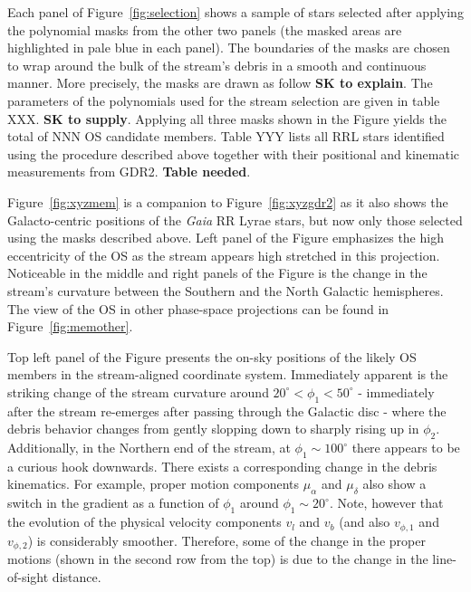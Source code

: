 \documentclass[a4paper,useAMS,usenatbib]{mnras}
\newcommand{\gaia}{\textit{Gaia} }
\begin{document}
Each panel of Figure~\ref{fig:selection} shows a sample of stars
selected after applying the polynomial masks from the other two panels
(the masked areas are highlighted in pale blue in each panel). The
boundaries of the masks are chosen to wrap around the bulk of the
stream's debris in a smooth and continuous manner. More precisely, the
masks are drawn as follow {\bf SK to explain}. The parameters of the
polynomials used for the stream selection are given in table XXX. {\bf
  SK to supply}. Applying all three masks shown in the Figure yields
the total of NNN OS candidate members. Table YYY lists all RRL stars
identified using the procedure described above together with their
positional and kinematic measurements from GDR2. {\bf Table
  needed}.

Figure~\ref{fig:xyzmem} is a companion to Figure~\ref{fig:xyzgdr2} as
it also shows the Galacto-centric positions of the \gaia RR Lyrae
stars, but now only those selected using the masks described
above. Left panel of the Figure emphasizes the high eccentricity of
the OS as the stream appears high stretched in this
projection. Noticeable in the middle and right panels of the Figure is
the change in the stream's curvature between the Southern and the
North Galactic hemispheres. The view of the OS in other phase-space
projections can be found in Figure~\ref{fig:memother}.

Top left panel of the Figure presents the on-sky positions of the
likely OS members in the stream-aligned coordinate system. Immediately
apparent is the striking change of the stream curvature around
$20^{\circ}<\phi_1<50^{\circ}$ - immediately after the stream re-emerges after
passing through the Galactic disc - where the debris behavior changes
from gently slopping down to sharply rising up in
$\phi_2$. Additionally, in the Northern end of the stream, at
$\phi_1\sim100^{\circ}$ there appears to be a curious hook
downwards. There exists a corresponding change in the debris
kinematics. For example, proper motion components $\mu_{\alpha}$ and
$\mu_{\delta}$ also show a switch in the gradient as a function of
$\phi_1$ around $\phi_1\sim20^{\circ}$. Note, however that the
evolution of the physical velocity components $v_l$ and $v_b$ (and
also $v_{\phi,1}$ and $v_{\phi,2}$) is considerably
smoother. Therefore, some of the change in the proper motions (shown
in the second row from the top) is due to the change in the
line-of-sight distance.
\end{document}
